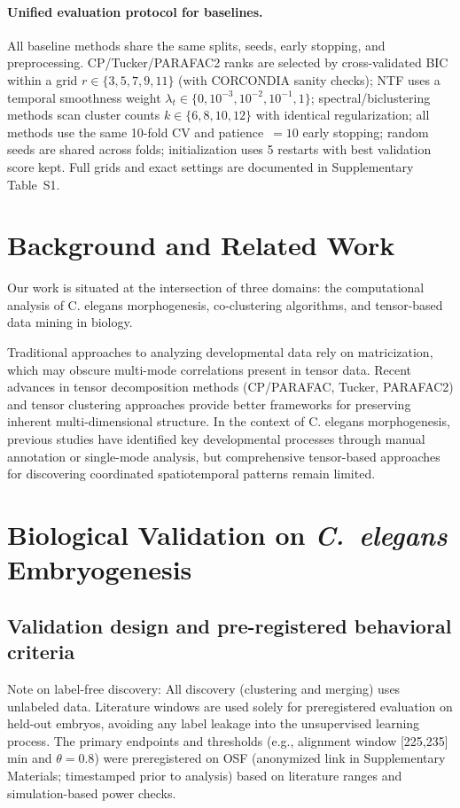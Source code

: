 \documentclass[unnumsec,webpdf,modern,large,namedate]{oup-authoring-template}%
\theoremstyle{thmstyleone}\newtheorem{theorem}{Theorem}
\theoremstyle{thmstyletwo}\newtheorem{example}{Example}
\theoremstyle{thmstylethree}\newtheorem{definition}{Definition}
\begin{document}
\paragraph{Unified evaluation protocol for baselines.} All baseline methods share the same splits, seeds, early stopping, and preprocessing. CP/Tucker/PARAFAC2 ranks are selected by cross-validated BIC within a grid $r\in\{3,5,7,9,11\}$ (with CORCONDIA sanity checks); NTF uses a temporal smoothness weight $\lambda_t\in\{0,10^{-3},10^{-2},10^{-1},1\}$; spectral/biclustering methods scan cluster counts $k\in\{6,8,10,12\}$ with identical regularization; all methods use the same 10-fold CV and patience~$=10$ early stopping; random seeds are shared across folds; initialization uses 5 restarts with best validation score kept. Full grids and exact settings are documented in Supplementary Table~S1.

\section{Background and Related Work}

Our work is situated at the intersection of three domains: the computational analysis of C. elegans morphogenesis, co-clustering algorithms, and tensor-based data mining in biology. 

Traditional approaches to analyzing developmental data rely on matricization, which may obscure multi-mode correlations present in tensor data. Recent advances in tensor decomposition methods (CP/PARAFAC, Tucker, PARAFAC2) and tensor clustering approaches provide better frameworks for preserving inherent multi-dimensional structure. In the context of C. elegans morphogenesis, previous studies have identified key developmental processes through manual annotation or single-mode analysis, but comprehensive tensor-based approaches for discovering coordinated spatiotemporal patterns remain limited.

\section{Biological Validation on \textit{C.~elegans} Embryogenesis}
\label{sec:celegans_validation}

\subsection{Validation design and pre-registered behavioral criteria}
Note on label-free discovery: All discovery (clustering and merging) uses unlabeled data. Literature windows are used solely for preregistered evaluation on held-out embryos, avoiding any label leakage into the unsupervised learning process. The primary endpoints and thresholds (e.g., alignment window [225,235] min and $\theta=0.8$) were preregistered on OSF (anonymized link in Supplementary Materials; timestamped prior to analysis) based on literature ranges and simulation-based power checks.
\end{document}
